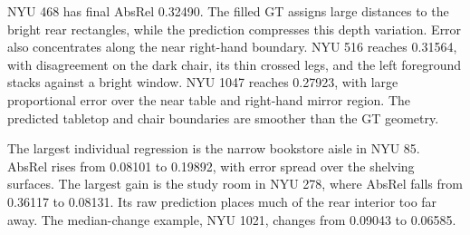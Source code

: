 NYU 468 has final AbsRel 0.32490. The filled GT assigns large distances to the bright rear rectangles, while the prediction compresses this depth variation. Error also concentrates along the near right-hand boundary. NYU 516 reaches 0.31564, with disagreement on the dark chair, its thin crossed legs, and the left foreground stacks against a bright window. NYU 1047 reaches 0.27923, with large proportional error over the near table and right-hand mirror region. The predicted tabletop and chair boundaries are smoother than the GT geometry.

The largest individual regression is the narrow bookstore aisle in NYU 85. AbsRel rises from 0.08101 to 0.19892, with error spread over the shelving surfaces. The largest gain is the study room in NYU 278, where AbsRel falls from 0.36117 to 0.08131. Its raw prediction places much of the rear interior too far away. The median-change example, NYU 1021, changes from 0.09043 to 0.06585.
